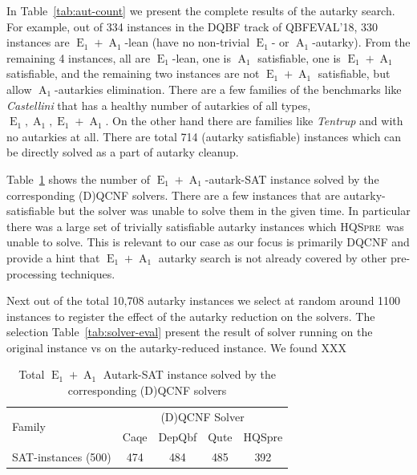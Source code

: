 \documentclass[runningheads]{llncs}
\DeclareMathOperator{\Aaut}{A}
\DeclareMathOperator{\Eaut}{E}
\newcommand{\hqspre}{\textsc{HQSpre}}
\begin{document}
In Table~\ref{tab:aut-count} we present the complete results of the autarky search. For example, out of 334 instances in the DQBF track of QBFEVAL'18, 330 instances are $\Eaut_1+\Aaut_1$-lean (have no non-trivial $\Eaut_1$- or $\Aaut_1$-autarky). From the remaining 4 instances, all are $\Eaut_1$-lean, one is $\Aaut_1$ satisfiable, one is $\Eaut_1+\Aaut_1$ satisfiable, and the remaining two instances are not $\Eaut_1+\Aaut_1$ satisfiable, but allow $\Aaut_1$-autarkies elimination.
%
There are a few families of the benchmarks like \textit{Castellini} that has a healthy number of autarkies of all types, $\Eaut_1,\Aaut_1,\Eaut_1+\Aaut_1$. On the other hand there are families like \textit{Tentrup} and  with no autarkies at all. There are total 714 (autarky satisfiable) instances which can be directly solved as a part of autarky cleanup.

Table~\ref{tab:sat-solver} shows the number of $\Eaut_1+\Aaut_1$-autark-SAT instance solved by the corresponding (D)QCNF solvers. There are a few instances that are autarky-satisfiable but the solver was unable to solve them in the given time. In particular there was a large set of trivially satisfiable autarky instances which \hqspre\ was unable to solve. This is relevant to our case as our focus is primarily DQCNF and provide a hint that $\Eaut_1+\Aaut_1$ autarky search is not already covered by other pre-processing techniques.

Next out of the total 10,708 autarky instances we select at random around 1100 instances to register the effect of the autarky reduction on the solvers. The selection
%
Table~\ref{tab:solver-eval} present the result of solver running on the original instance vs on the autarky-reduced instance. We found XXX



\begin{table}
	\caption{Total $\Eaut_1+\Aaut_1$ Autark-SAT instance solved by the corresponding (D)QCNF solvers}\label{tab:sat-solver}
	\begin{tabular}{l|c|c|c|c}

		\hline
		\multirow{2}{3cm}{Family}  & \multicolumn{4}{c}{(D)QCNF Solver} \\
		\cline{2-5}
		& Caqe & DepQbf & Qute & HQSpre  \\

		\hline

		SAT-instances (500) &  474 & 484 & 485 & 392 \\

		\hline
	\end{tabular}
\end{table}
\end{document}
